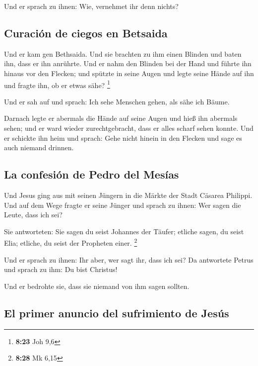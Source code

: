  Und er sprach zu ihnen: Wie, vernehmet ihr denn nichts?

\hypertarget{curaciuxf3n-de-ciegos-en-betsaida}{%
\subsection{Curación de ciegos en
Betsaida}\label{curaciuxf3n-de-ciegos-en-betsaida}}

 Und er kam gen Bethsaida. Und sie brachten zu ihm einen
Blinden und baten ihn, dass er ihn anrührte.  Und er nahm
den Blinden bei der Hand und führte ihn hinaus vor den Flecken; und
spützte in seine Augen und legte seine Hände auf ihn und fragte ihn, ob
er etwas sähe? \footnote{\textbf{8:23} Joh 9,6}

 Und er sah auf und sprach: Ich sehe Menschen gehen, als
sähe ich Bäume.

 Darnach legte er abermals die Hände auf seine Augen und
hieß ihn abermals sehen; und er ward wieder zurechtgebracht, dass er
alles scharf sehen konnte.  Und er schickte ihn heim und
sprach: Gehe nicht hinein in den Flecken und sage es auch niemand
drinnen.

\hypertarget{la-confesiuxf3n-de-pedro-del-mesuxedas}{%
\subsection{La confesión de Pedro del
Mesías}\label{la-confesiuxf3n-de-pedro-del-mesuxedas}}

 Und Jesus ging aus mit seinen Jüngern in die Märkte der
Stadt Cäsarea Philippi. Und auf dem Wege fragte er seine Jünger und
sprach zu ihnen: Wer sagen die Leute, dass ich sei?

 Sie antworteten: Sie sagen du seist Johannes der Täufer;
etliche sagen, du seist Elia; etliche, du seist der Propheten einer.
\footnote{\textbf{8:28} Mk 6,15}

 Und er sprach zu ihnen: Ihr aber, wer sagt ihr, dass ich
sei? Da antwortete Petrus und sprach zu ihm: Du bist Christus!

 Und er bedrohte sie, dass sie niemand von ihm sagen
sollten.

\hypertarget{el-primer-anuncio-del-sufrimiento-de-jesuxfas}{%
\subsection{El primer anuncio del sufrimiento de
Jesús}\label{el-primer-anuncio-del-sufrimiento-de-jesuxfas}}

